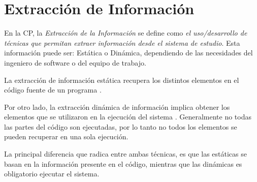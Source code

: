 



\section{Extracción de Información}

En la CP, la \textit{Extracción de la Información} se define como \textit{el uso/desarrollo de técnicas que permitan extraer información desde el sistema de estudio}. 
Esta información puede ser: Estática o Dinámica, dependiendo de las necesidades del 
ingeniero de software o del equipo de trabajo.

La extracción de información estática recupera los distintos elementos en el código fuente de un programa \cite{AHUL06}. 



Por otro lado, la extracción dinámica de información implica obtener los elementos que se utilizaron en la ejecución del sistema \cite{THBE99}. Generalmente no todas las partes del código son ejecutadas, por lo tanto no todos los elementos se pueden recuperar en una sola ejecución.

 
La principal diferencia que radica entre ambas técnicas,  es que las estáticas se basan en la información presente en el código, mientras que las dinámicas es obligatorio ejecutar el sistema.

